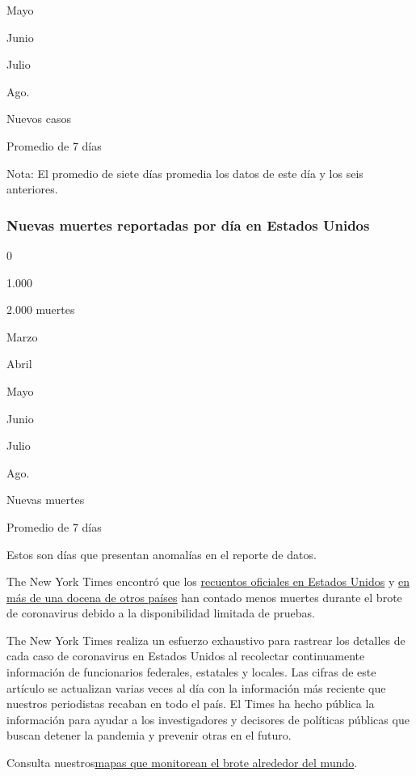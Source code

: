 Mayo

Junio

Julio

Ago.

Nuevos casos

Promedio de 7 días

Nota: El promedio de siete días promedia los datos de este día y los
seis anteriores.

\hypertarget{nuevas-muertes-reportadas-por-duxeda-en-estados-unidos}{%
\subsubsection{Nuevas muertes reportadas por día en Estados
Unidos}\label{nuevas-muertes-reportadas-por-duxeda-en-estados-unidos}}

0

1.000

2.000 muertes

Marzo

Abril

Mayo

Junio

Julio

Ago.

Nuevas muertes

Promedio de 7 días

Estos son días que presentan anomalías en el reporte de datos.

The New York Times encontró que los
\href{https://www.nytimes3xbfgragh.onion/interactive/2020/04/28/us/coronavirus-death-toll-total.html}{recuentos
oficiales en Estados Unidos} y
\href{https://www.nytimes3xbfgragh.onion/interactive/2020/04/21/world/coronavirus-missing-deaths.html}{en
más de una docena de otros países} han contado menos muertes durante el
brote de coronavirus debido a la disponibilidad limitada de pruebas.

The New York Times realiza un esfuerzo exhaustivo para rastrear los
detalles de cada caso de coronavirus en Estados Unidos al recolectar
continuamente información de funcionarios federales, estatales y
locales. Las cifras de este artículo se actualizan varias veces al día
con la información más reciente que nuestros periodistas recaban en todo
el país. El Times ha hecho pública la información para ayudar a los
investigadores y decisores de políticas públicas que buscan detener la
pandemia y prevenir otras en el futuro.

Consulta
nuestros\href{https://www.nytimes3xbfgragh.onion/interactive/2020/world/coronavirus-maps.html}{mapas
que monitorean el brote alrededor del mundo}.

